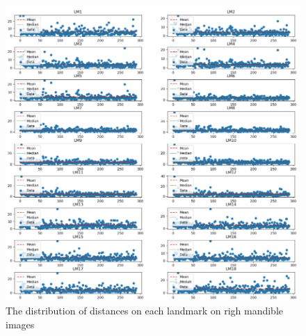 \documentclass[review]{elsarticle}
\begin{document}
\begin{figure}[htbp]
    \centering
    \includegraphics[scale=0.5]{images/charts/md_2.png}
    \caption{The distribution of distances on each landmark on righ mandible images}
\end{figure}
\end{document}
